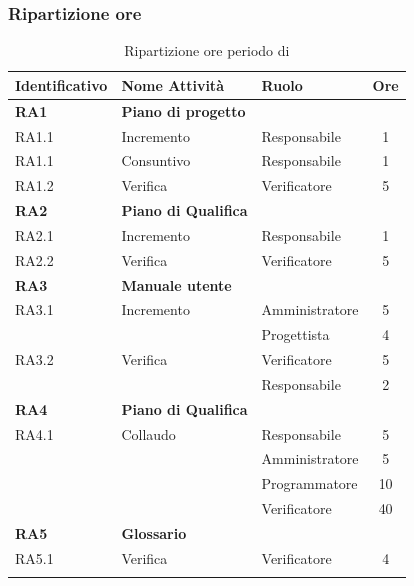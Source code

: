 \subsubsection{Ripartizione ore}
\bgroup
\begin{longtable}{|l|l|l|c|}
	\endfirsthead
	\hline
	\textbf{Identificativo} &
	\textbf{Nome Attività} &
	\textbf{Ruolo} &
	\textbf{Ore}\\
	\endhead
	\hline
	\textbf{RA1} & \textbf{Piano di progetto} &  &  \\
	\hline
	{RA1.1} & {Incremento} & Responsabile  & 1\\
	\hline
	{RA1.1} & {Consuntivo} & Responsabile  & 1\\
	\hline
	{RA1.2} & {Verifica} & Verificatore & 5 \\
	\hline
	\textbf{RA2} & \textbf{Piano di Qualifica}  & & \\
	\hline
	{RA2.1} & {Incremento} & Responsabile &  1\\
	\hline
	{RA2.2} & {Verifica} & Verificatore & 5 \\
	\hline
	\textbf{RA3} & \textbf{Manuale utente} & &  \\
	\hline
	{RA3.1} & {Incremento} & Amministratore  &  5\\
	& & Progettista & 4 \\
	\hline
	{RA3.2} & {Verifica} & Verificatore  &  5\\
	& & Responsabile & 2 \\
	\hline
	\textbf{RA4} & \textbf{Piano di Qualifica}  & & \\
	\hline
	{RA4.1} & {Collaudo} & Responsabile &  5\\
	& & Amministratore & 5 \\
	& & Programmatore & 10 \\
	& & Verificatore & 40 \\
	\hline
	\textbf{RA5} & \textbf{Glossario} & &  \\
	\hline
	{RA5.1} & {Verifica} & Verificatore &  4 \\
	\hline

	\caption{Ripartizione ore periodo di \VV{}}
\end{longtable}
\egroup

